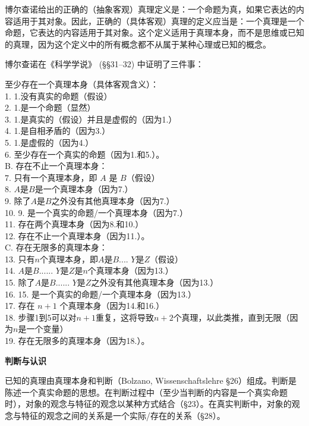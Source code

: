 博尔查诺给出的正确的（抽象客观）真理定义是：一个命题为真，如果它表达的内容适用于其对象。因此，正确的（具体客观）真理的定义应当是：一个真理是一个命题，它表达的内容适用于其对象。这个定义适用于真理本身，而不是思维或已知的真理，因为这个定义中的所有概念都不从属于某种心理或已知的概念。

博尔查诺在《科学学说》 (§§31–32) 中证明了三件事：

至少存在一个真理本身（具体客观含义）：\\
1. 1.没有真实的命题（假设）\\
2. 1.是一个命题（显然）\\
3. 1.是真实的（假设）并且是虚假的（因为1.）\\
4. 1.是自相矛盾的（因为3.）\\
5. 1.是虚假的（因为4.）\\
6. 至少存在一个真实的命题（因为1.和5.）。\\
B. 存在不止一个真理本身：\\
7. 只有一个真理本身，即 \(A\) 是 \(B\)（假设）\\
8. \(A\)是\(B\)是一个真理本身（因为7.）\\
9. 除了\(A\)是\(B \)之外没有其他真理本身（因为7.）\\
10. 9. 是一个真实的命题/一个真理本身（因为7.）\\
11. 存在两个真理本身（因为8.和10.）\\
12. 存在不止一个真理本身（因为11.）。\\
C. 存在无限多的真理本身：\\
13. 只有\(n\)个真理本身，即\(A\)是\(B\)....  \(Y\)是\(Z\)（假设）\\
14. \(A\)是\(B\)...... \(Y\)是\(Z\)是\(n\)个真理本身（因为13.）\\
15. 除了\(A\)是\(B\)...... \(Y\)是\(Z\)之外没有其他真理本身（因为13.）\\
16. 15. 是一个真实的命题/一个真理本身（因为13.）\\
17. 存在 \(n+1\) 个真理本身（因为14.和16.）\\
18. 步骤1到5可以对\(n+1\)重复，这将导致\(n+2\)个真理，以此类推，直到无限（因为\(n\)是一个变量）\\
19. 存在无限多的真理本身（因为18.）。

\textbf{判断与认识}
  
已知的真理由真理本身和判断（Bolzano, Wissenschaftslehre §26）组成。判断是陈述一个真实命题的思想。在判断过程中（至少当判断的内容是一个真实命题时），对象的观念与特征的观念以某种方式结合（§23）。在真实判断中，对象的观念与特征的观念之间的关系是一个实际/存在的关系（§28）。

